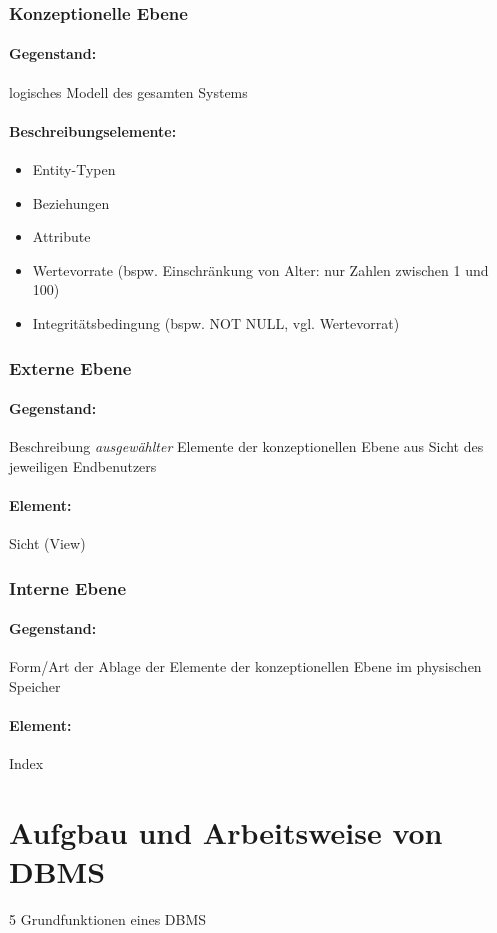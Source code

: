 \subsubsection{Konzeptionelle Ebene}
\paragraph{Gegenstand:} logisches Modell des gesamten Systems
\paragraph{Beschreibungselemente:}
\begin{itemize}
\item Entity-Typen
\item Beziehungen
\item Attribute
\item Wertevorrate (bspw. Einschränkung von Alter: nur Zahlen zwischen 1 und 100)
\item Integritätsbedingung (bspw. NOT NULL, vgl. Wertevorrat)
\end{itemize}
\subsubsection{Externe Ebene}
\paragraph{Gegenstand:} Beschreibung \emph{ausgewählter} Elemente der konzeptionellen Ebene aus Sicht des jeweiligen Endbenutzers
\paragraph{Element:} Sicht (View)
\subsubsection{Interne Ebene}
\paragraph{Gegenstand:} Form/Art der Ablage der Elemente der konzeptionellen Ebene im physischen Speicher
\paragraph{Element:} Index

\section{Aufgbau und Arbeitsweise von DBMS}
5 Grundfunktionen eines DBMS

